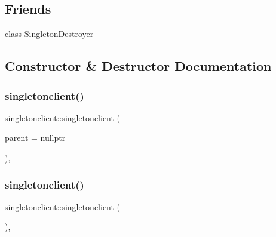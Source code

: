 \subsection*{Friends}
\begin{DoxyCompactItemize}
\item 
class \mbox{\hyperlink{classsingletonclient_aa93ce997b9645496c0e17460fba08432}{Singleton\+Destroyer}}
\end{DoxyCompactItemize}


\subsection{Constructor \& Destructor Documentation}
\mbox{\label{classsingletonclient_a799b3790931c71f18b3cc967d0295790}} 
\subsubsection{\texorpdfstring{singletonclient()}{singletonclient()}\hspace{0.1cm}{\footnotesize\ttfamily [1/2]}}
{\footnotesize\ttfamily singletonclient\+::singletonclient (\begin{DoxyParamCaption}\item[{Q\+Object $\ast$}]{parent = {\ttfamily nullptr} }\end{DoxyParamCaption})\hspace{0.3cm}{\ttfamily [explicit]}, {\ttfamily [protected]}}

\mbox{\label{classsingletonclient_ae22d833d9a9bb18aba90023bae28a680}} 
\subsubsection{\texorpdfstring{singletonclient()}{singletonclient()}\hspace{0.1cm}{\footnotesize\ttfamily [2/2]}}
{\footnotesize\ttfamily singletonclient\+::singletonclient (\begin{DoxyParamCaption}\item[{\mbox{\hyperlink{classsingletonclient}{singletonclient}} \&}]{ }\end{DoxyParamCaption})\hspace{0.3cm}{\ttfamily [protected]}, {\ttfamily [delete]}}

